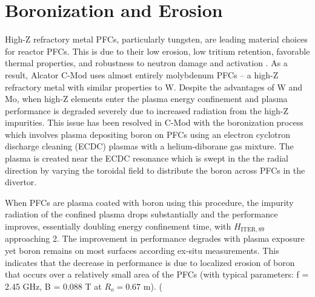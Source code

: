 \documentclass[final,3p,times,twocolumn]{elsarticle}
\begin{document}

\section{Boronization and Erosion}
\label{sec:BZNOverview}

High-Z refractory metal PFCs, particularly tungsten, are leading material choices for reactor PFCs. This is due to their low erosion, low tritium retention, favorable thermal properties, and robustness to neutron damage and activation \cite{WWoBoronization}. As a result, Alcator C-Mod uses almost entirely molybdenum PFCs -- a high-Z refractory metal with similar properties to W.  Despite the advantages of W and Mo, when high-Z elements enter the plasma energy confinement and plasma performance is degraded severely due to increased radiation from the high-Z impurities. %
This issue has been resolved in C-Mod with the boronization process which involves plasma depositing boron on PFCs using an electron cyclotron discharge cleaning (ECDC) plasmas with a helium-diborane gas mixture. The plasma is created near the ECDC resonance which is swept in the the radial direction by varying the toroidal field to distribute the boron across PFCs in the divertor. 

When PFCs are plasma coated with boron using this procedure, the impurity radiation of the confined plasma drops substantially and the performance improves, essentially doubling energy confinement time, with $H_\mathrm{ITER,89}$ approaching 2.%
The improvement in performance degrades with plasma exposure yet boron remains on most surfaces according ex-situ measurements. This indicates that the decrease in performance is due to localized erosion of boron that occurs over a relatively small area of the PFCs (with typical parameters: f = 2.45 GHz, B = 0.088 T at $R_o = 0.67$ m). (%
\end{document}
